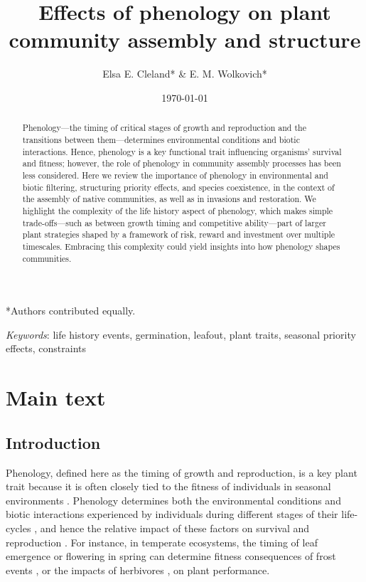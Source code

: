 \documentclass[11pt]{article}
\begin{document}
\renewcommand{\refname}{\CHead{}}

\title{Effects of phenology on plant community assembly and structure }
\author{Elsa E. Cleland* \& E. M. Wolkovich*}
\date{\today}
\maketitle


\setlength{\parindent}{0cm}
\setlength{\parskip}{5pt}
*Authors contributed equally.

\begin{abstract} %
Phenology---the timing of critical stages of growth and reproduction and the transitions between them---determines environmental conditions and biotic interactions. Hence, phenology is a key functional trait influencing organisms' survival and fitness; however, the role of phenology in community assembly processes has been less considered. Here we review the importance of phenology in environmental and biotic filtering, structuring priority effects, and species coexistence, in the context of the assembly of native communities, as well as in invasions and restoration. We highlight the complexity of the life history aspect of phenology, which makes simple trade-offs---such as between growth timing and competitive ability---part of larger plant strategies shaped by a framework of risk, reward and investment over multiple timescales. Embracing this complexity could yield insights into how phenology shapes communities.
\end{abstract}

\emph{Keywords}: life history events, germination, leafout, plant traits, seasonal priority effects, constraints

\section{Main text}
\linenumbers
\subsection*{Introduction} 

Phenology, defined here as the timing of growth and reproduction, is a key plant trait because it is often closely tied to the fitness of individuals in seasonal environments \citep{verdu2005early,munguia2011meta}. Phenology determines both the environmental conditions and biotic interactions experienced by individuals during different stages of their life-cycles \citep{donohue2005niche}, and hence the relative impact of these factors on survival and reproduction \citep{caruso2019meta}. For instance, in temperate ecosystems, the timing of leaf emergence or flowering in spring can determine fitness consequences of frost events \citep{inouye2008effects,augspurger2013reconstructing}, or the impacts of herbivores \citep{meineke2021phenological}, on plant performance.
\end{document}
